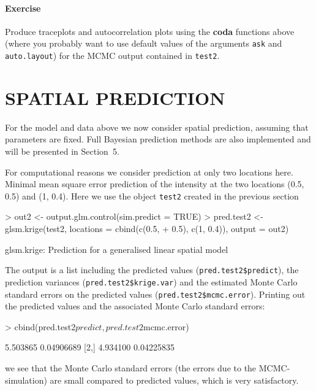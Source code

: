 \documentclass[12pt,a4paper]{article}
\newcommand{\strong}[1]{{\textbf{ #1}}}
\let\pkg=\strong
\newcommand{\code}[1]{\texttt{\small #1}}
\let\command=\code
\begin{document}
\paragraph*{Exercise} Produce traceplots and autocorrelation plots
using the \pkg{coda} functions above (where you probably want
to use default values of the arguments \code{ask} and \code{auto.layout}) for
the MCMC output contained in \code{test2}.  



\section{SPATIAL PREDICTION}

For the model and data above we now consider spatial prediction, assuming that parameters are fixed.
Full Bayesian prediction methods are also implemented and will be presented in
Section~5. 

For computational
reasons we consider prediction at only two locations here.
Minimal mean square error prediction of the intensity at the two
locations (0.5, 0.5) and (1, 0.4). Here we use the object
\command{test2} created in
the previous section
\begin{Schunk}
\begin{Sinput}
> out2 <- output.glm.control(sim.predict = TRUE)
> pred.test2 <- glsm.krige(test2, locations = cbind(c(0.5, 
+     0.5), c(1, 0.4)), output = out2)
\end{Sinput}
\begin{Soutput}
 glsm.krige: Prediction for a generalised linear spatial model 
\end{Soutput}
\end{Schunk}

The output is a list including the predicted values (\code{pred.test2\$predict}), the prediction variances 
(\code{pred.test2\$krige.var}) and the estimated Monte Carlo standard errors on the predicted values (\code{pred.test2\$mcmc.error}). 
Printing out the predicted values and the associated Monte Carlo standard errors:
\begin{Schunk}
\begin{Sinput}
> cbind(pred.test2$predict, pred.test2$mcmc.error)
\end{Sinput}
\begin{Soutput}
         [,1]       [,2]
[1,] 5.503865 0.04906689
[2,] 4.934100 0.04225835
\end{Soutput}
\end{Schunk}
we see that the Monte Carlo standard errors (the errors due to the MCMC-simulation) are small 
compared to predicted values, which is very satisfactory.
\end{document}
